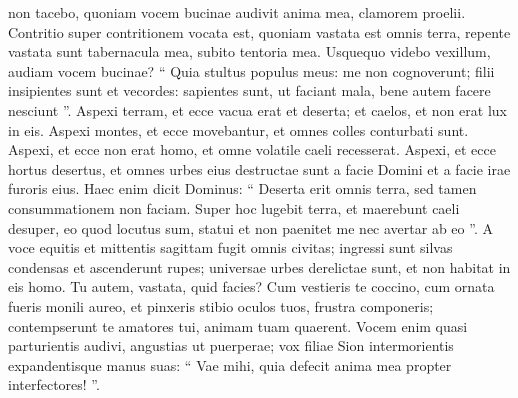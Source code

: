 \begin{biblechapter}
\begin{biblechapter}
\begin{biblechapter}
\begin{biblechapter}
 non tacebo,
 quoniam vocem bucinae audivit anima mea,
 clamorem proelii.
 \verse Contritio super contritionem vocata est,
 quoniam vastata est omnis terra,
 repente vastata sunt tabernacula mea,
 subito tentoria mea.
 \verse Usquequo videbo vexillum,
 audiam vocem bucinae?
 \verse “ Quia stultus populus meus:
 me non cognoverunt;
 filii insipientes sunt et vecordes:
 sapientes sunt, ut faciant mala,
 bene autem facere nesciunt ”.
 \verse Aspexi terram, et ecce vacua erat et deserta;
 et caelos, et non erat lux in eis.
 \verse Aspexi montes, et ecce movebantur,
 et omnes colles conturbati sunt.
 \verse Aspexi, et ecce non erat homo,
 et omne volatile caeli recesserat.
 \verse Aspexi, et ecce hortus desertus,
 et omnes urbes eius destructae sunt
 a facie Domini et a facie irae furoris eius.
 \verse Haec enim dicit Dominus:
 “ Deserta erit omnis terra,
 sed tamen consummationem non faciam.
 \verse Super hoc lugebit terra,
 et maerebunt caeli desuper,
 eo quod locutus sum,
 statui et non paenitet me
 nec avertar ab eo ”.
 \verse A voce equitis et mittentis sagittam
 fugit omnis civitas;
 ingressi sunt silvas condensas
 et ascenderunt rupes;
 universae urbes derelictae sunt,
 et non habitat in eis homo.
 \verse Tu autem, vastata, quid facies?
 Cum vestieris te coccino,
 cum ornata fueris monili aureo,
 et pinxeris stibio oculos tuos,
 frustra componeris;
 contempserunt te amatores tui,
 animam tuam quaerent.
 \verse Vocem enim quasi parturientis audivi,
 angustias ut puerperae;
 vox filiae Sion
 intermorientis expandentisque manus suas:
 “ Vae mihi, quia defecit anima mea
 propter interfectores! ”.
 

\end{biblechapter}
\end{biblechapter}
\end{biblechapter}
\end{biblechapter}
